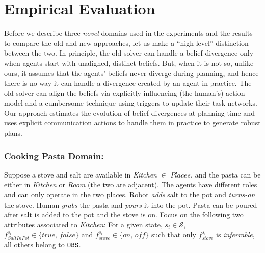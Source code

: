 \documentclass[letterpaper]{article} %
\begin{document}
\section{Empirical Evaluation}

Before we describe three {\em novel} domains used in the experiments and the results to compare the old and new approaches, let us make a ``high-level'' distinction between the two. 
In principle, the old solver can handle a belief divergence only when agents start with unaligned, distinct beliefs. But, when it is not so, unlike ours, it assumes that the agents' beliefs never diverge during planning, and hence there is no way it can handle a divergence created by an agent in practice. 
The old solver can align the beliefs via explicitly influencing (the human's) action model and a cumbersome technique using triggers to update their task networks. Our approach estimates the evolution of belief divergences at planning time and uses explicit communication actions to handle them in practice to generate robust plans. 

\subsubsection{Cooking Pasta Domain:}
Suppose a stove and salt are available in \textit{Kitchen} $\in$ $\textit{Places}$, and the pasta can be either in \textit{Kitchen} or \textit{Room} (the two are adjacent). The agents have different roles and can only operate in the two places. Robot \textit{adds} salt to the pot and \textit{turns-on} the stove. Human \textit{grabs} the pasta and \textit{pours} it into the pot. 
Pasta can be poured after salt is added to the pot and the stove is {\sc on}.
Focus on the following two attributes associated to \textit{Kitchen}: For a given state, $s_i \in \mathcal{S}$, $f_{\textit{SaltInPot}}^{s_i} \in \{\textit{true, false}\}$ and $f_{\textit{stove}}^{s_i} \in \{\textit{on, off}\}$ such that only $f_{\textit{stove}}^{s_i}$ is \textit{inferrable}, all others belong to $\texttt{OBS}$.
\end{document}
